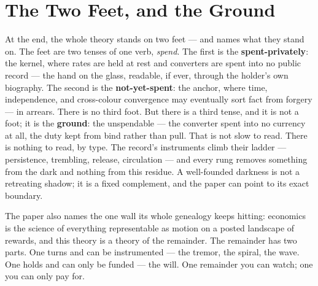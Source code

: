 \section{The Two Feet, and the Ground}
\label{sec:explainer:two-feet}

At the end, the whole theory stands on two feet --- and names what they stand on. The feet are two tenses of one verb, \emph{spend}. The first is the \textbf{spent-privately}: the kernel, where rates are held at rest and converters are spent into no public record --- the hand on the glass, readable, if ever, through the holder's own biography. The second is the \textbf{not-yet-spent}: the anchor, where time, independence, and cross-colour convergence may eventually sort fact from forgery --- in arrears. There is no third foot. But there is a third tense, and it is not a foot; it is the \textbf{ground}: the unspendable --- the converter spent into no currency at all, the duty kept from bind rather than pull. That is not slow to read. There is nothing to read, by type. The record's instruments climb their ladder --- persistence, trembling, release, circulation --- and every rung removes something from the dark and nothing from this residue. A well-founded darkness is not a retreating shadow; it is a fixed complement, and the paper can point to its exact boundary.

The paper also names the one wall its whole genealogy keeps hitting: economics is the science of everything representable as motion on a posted landscape of rewards, and this theory is a theory of the remainder. The remainder has two parts. One turns and can be instrumented --- the tremor, the spiral, the wave. One holds and can only be funded --- the will. One remainder you can watch; one you can only pay for.

\par
